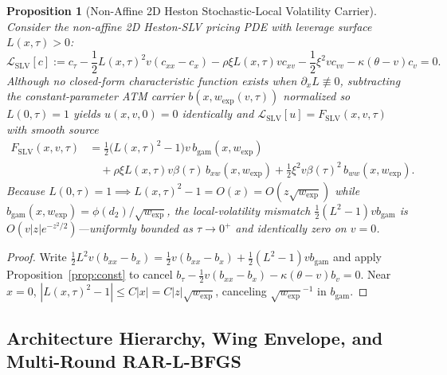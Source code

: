 \documentclass[preprint,12pt]{elsarticle}
\newtheorem{proposition}{Proposition}
\begin{document}
\begin{proposition}[Non-Affine 2D Heston Stochastic-Local Volatility Carrier]
\label{prop:slv}
Consider the non-affine 2D Heston-SLV pricing PDE with leverage surface $L(x, \tau) > 0$:
\begin{equation}
  \mathcal{L}_{\mathrm{SLV}}[c] := c_\tau - \frac{1}{2}L(x,\tau)^2 v(c_{xx} - c_x) - \rho\xi L(x,\tau) v c_{xv} - \frac{1}{2}\xi^2 v c_{vv} - \kappa(\theta - v)c_v = 0.
  \label{eq:slv_pde}
\end{equation}
Although no closed-form characteristic function exists when $\partial_x L \not\equiv 0$, subtracting the constant-parameter ATM carrier $b(x, w_{\mathrm{exp}}(v, \tau))$ normalized so $L(0, \tau) = 1$ yields $u(x, v, 0) = 0$ identically and $\mathcal{L}_{\mathrm{SLV}}[u] = F_{\mathrm{SLV}}(x, v, \tau)$ with smooth source
\begin{equation}
\begin{split}
  F_{\mathrm{SLV}}(x, v, \tau) &= \frac{1}{2}\big(L(x,\tau)^2 - 1\big)v\,b_{\mathrm{gam}}(x, w_{\mathrm{exp}}) \\
  &\quad + \rho\xi L(x,\tau)v\beta(\tau)\,b_{xw}(x, w_{\mathrm{exp}}) + \frac{1}{2}\xi^2 v\beta(\tau)^2\,b_{ww}(x, w_{\mathrm{exp}}).
\end{split}
  \label{eq:f_slv}
\end{equation}
Because $L(0, \tau) = 1 \implies L(x, \tau)^2 - 1 = O(x) = O(z\sqrt{w_{\mathrm{exp}}})$ while $b_{\mathrm{gam}}(x, w_{\mathrm{exp}}) = \phi(d_2)/\sqrt{w_{\mathrm{exp}}}$, the local-volatility mismatch $\frac{1}{2}(L^2 - 1)v b_{\mathrm{gam}}$ is $O(v |z| e^{-z^2/2})$---uniformly bounded as $\tau \to 0^+$ and identically zero on $v = 0$.
\end{proposition}
\begin{proof}
Write $\frac{1}{2}L^2 v(b_{xx} - b_x) = \frac{1}{2}v(b_{xx} - b_x) + \frac{1}{2}(L^2 - 1)v b_{\mathrm{gam}}$ and apply Proposition~\ref{prop:const} to cancel $b_\tau - \frac{1}{2}v(b_{xx} - b_x) - \kappa(\theta - v)b_v = 0$. Near $x = 0$, $|L(x,\tau)^2 - 1| \le C|x| = C|z|\sqrt{w_{\mathrm{exp}}}$, canceling $\sqrt{w_{\mathrm{exp}}}^{-1}$ in $b_{\mathrm{gam}}$.
\end{proof}

\subsection{Architecture Hierarchy, Wing Envelope, and Multi-Round RAR-L-BFGS}
\end{document}
